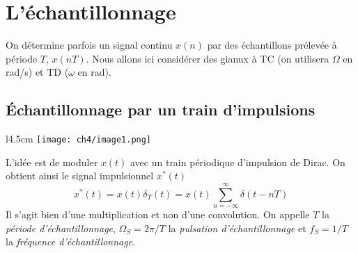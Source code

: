 \chapter{L’échantillonnage}
On détermine parfois un signal continu $x(n)$ par des échantillons prélevée à période $T$, 
$x(nT)$. Nous allons ici considérer des gianux à TC (on utilisera $\Omega$ en rad/s) et 
TD ($\omega$ en rad).

	\section{Échantillonnage par un train d'impulsions}
	\begin{wrapfigure}[12]{l}{4.5cm}
	\vspace{-5mm}
	\texttt{[image: ch4/image1.png]}
	\end{wrapfigure}
	L'idée est de moduler $x(t)$ avec un train périodique d'impulsion de Dirac. On obtient 
	ainsi le signal impulsionnel $x^*(t)$ 
	\begin{equation}
	x^*(t) = x(t)\delta_T(t) = x(t)\sum_{n=-\infty}^\infty \delta(t-nT)
	\end{equation}
	Il s'agit bien d'une multiplication et non d'une convolution.  On appelle $T$ la 
	\textit{période d’échantillonnage}, $\Omega_S = 2\pi/T$ la \textit{pulsation d’échantillonnage} 
	et $f_S=1/T$ la \textit{fréquence d’échantillonnage}.\\
	
